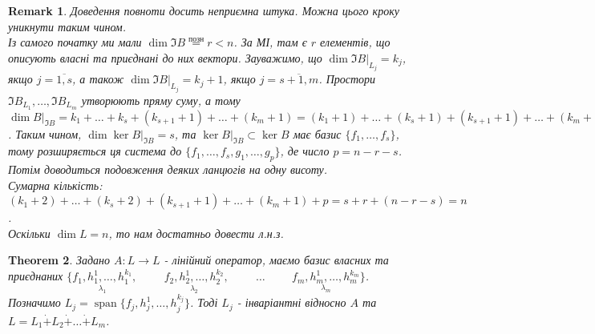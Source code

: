 \documentclass[a4paper, 10pt]{article}
\theoremstyle{theoremdd}
\newtheorem{theorem}{Theorem}[subsection]
\newtheorem{remark}[theorem]{Remark}
\DeclareMathOperator{\linspan}{span}
\begin{document}
\begin{remark}
Доведення повноти досить неприємна штука. Можна цього кроку уникнути таким чином.\\
Із самого початку ми мали $\dim \Im B \overset{\text{позн}}{=} r < n$. За МІ, там є $r$ елементів, що описують власні та приєднані до них вектори. Зауважимо, що $\dim \Im B|_{L_j} = k_j$, якщо $j = \overline{1,s}$, а також $\dim \Im B|_{L_j} = k_j + 1$, якщо $j = \overline{s+1,m}$. Простори $\Im B_{L_1},\dots, \Im B_{L_m}$ утворюють пряму суму, а тому $\dim B|_{\Im B} = k_1 + \dots + k_s + (k_{s+1}+1) + \dots + (k_m+1) = (k_1 + 1) + \dots + (k_s + 1) + (k_{s+1}+1) + \dots + (k_m+1) - s = r - s$. Таким чином, $\dim \ker B|_{\Im B} = s$, та $\ker B|_{\Im B} \subset \ker B$ має базис $\{f_1,\dots,f_s\}$, тому розширяється ця система до $\{f_1,\dots,f_s, g_1,\dots,g_p\}$, де число $p = n-r-s$.\\
Потім доводиться подовження деяких ланцюгів на одну висоту.\\
Сумарна кількість: $(k_1+2)+ \dots + (k_s+2) + (k_{s+1}+1) + \dots + (k_m+1) + p = s+r + (n-r-s) = n$.\\
Оскільки $\dim L = n$, то нам достатньо довести л.н.з.
\end{remark}

\begin{theorem}
Задано $A: L \to L$ - лінійний оператор, маємо базис власних та приєднаних $\{\underset{\lambda_1}{f_1, h_1^1, \dots ,h_1^{k_1}}, \hspace{1cm} \underset{\lambda_2}{f_2, h_2^1, \dots, h_2^{k_2}}, \hspace{1cm} \dots \hspace{1cm} \underset{\lambda_m}{f_m, h_m^{1}, \dots, h_m^{k_m}}\}$.\\
Позначимо $L_j = \linspan\{f_j, h_j^1,\dots, h_j^{k_j}\}$. Тоді $L_j$ - інваріантні відносно $A$ та $L = L_1 \dot{+} L_2 \dot{+} \dots \dot{+} L_m$.
\end{theorem}
\end{document}
